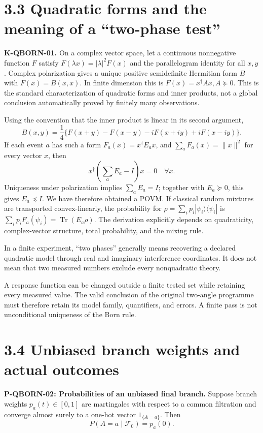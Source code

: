\documentclass[
  11pt,
  oneside]{book}
\begin{document}
\section{3.3 Quadratic forms and the meaning of a ``two-phase test''}

\textbf{K-QBORN-01.} On a complex vector space, let a continuous
nonnegative function \(F\) satisfy \(F(\lambda x)=|\lambda|^2F(x)\) and
the parallelogram identity for all \(x,y\). Complex polarization gives a
unique positive semidefinite Hermitian form \(B\) with \(F(x)=B(x,x)\).
In finite dimension this is \(F(x)=x^\dagger Ax,A\succeq0\). This is the
standard characterization of quadratic forms and inner products, not a
global conclusion automatically proved by finitely many observations.

Using the convention that the inner product is linear in its second
argument, \[
B(x,y)=\frac14\{F(x+y)-F(x-y)
-iF(x+iy)+iF(x-iy)\}.
\] If each event \(a\) has such a form \(F_a(x)=x^\dagger E_ax\), and
\(\sum_aF_a(x)=\|x\|^2\) for every vector \(x\), then \[
x^\dagger\left(\sum_aE_a-I\right)x=0\quad\forall x.
\] Uniqueness under polarization implies \(\sum_aE_a=I\); together with
\(E_a\succeq0\), this gives \(E_a\preceq I\). We have therefore obtained
a POVM. If classical random mixtures are transported convex-linearly,
the probability for \(\rho=\sum_ip_i|\psi_i\rangle\langle\psi_i|\) is
\(\sum_ip_iF_a(\psi_i)=\operatorname{Tr}(E_a\rho)\). The derivation
explicitly depends on quadraticity, complex-vector structure, total
probability, and the mixing rule.

In a finite experiment, ``two phases'' generally means recovering a
declared quadratic model through real and imaginary interference
coordinates. It does not mean that two measured numbers exclude every
nonquadratic theory.

A response function can be changed outside a finite tested set while
retaining every measured value. The valid conclusion of the original
two-angle programme must therefore retain its model family, quantifiers,
and errors. A finite pass is not unconditional uniqueness of the Born
rule.

\section{3.4 Unbiased branch weights and actual outcomes}

\label{p-qborn-02}{}

\textbf{P-QBORN-02: Probabilities of an unbiased final branch.} Suppose
branch weights \(p_a(t)\in[0,1]\) are martingales with respect to a
common filtration and converge almost surely to a one-hot vector
\(1_{\{A=a\}}\). Then \[
P(A=a\mid\mathcal F_0)=p_a(0).
\]
\end{document}

